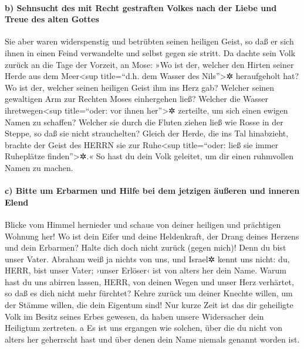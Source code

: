 \hypertarget{b-sehnsucht-des-mit-recht-gestraften-volkes-nach-der-liebe-und-treue-des-alten-gottes}{%
\paragraph{b) Sehnsucht des mit Recht gestraften Volkes nach der Liebe
und Treue des alten
Gottes}\label{b-sehnsucht-des-mit-recht-gestraften-volkes-nach-der-liebe-und-treue-des-alten-gottes}}

Sie aber waren widerspenstig und betrübten seinen
heiligen Geist, so daß er sich ihnen in einen Feind verwandelte und
selbst gegen sie stritt. Da dachte sein Volk zurück an
die Tage der Vorzeit, an Mose: »Wo ist der, welcher den Hirten seiner
Herde aus dem Meer\textless sup title=``d.h. dem Wasser des
Nils''\textgreater✲ heraufgeholt hat? Wo ist der, welcher seinen
heiligen Geist ihm ins Herz gab? Welcher seinen
gewaltigen Arm zur Rechten Moses einhergehen ließ? Welcher die Wasser
ihretwegen\textless sup title=``oder: vor ihnen her''\textgreater✲
zerteilte, um sich einen ewigen Namen zu schaffen?
Welcher sie durch die Fluten ziehen ließ wie Rosse in der
Steppe, so daß sie nicht strauchelten? Gleich der Herde,
die ins Tal hinabzieht, brachte der Geist des HERRN sie zur
Ruhe\textless sup title=``oder: ließ sie immer Ruheplätze
finden''\textgreater✲.« So hast du dein Volk geleitet, um dir einen
ruhmvollen Namen zu machen.

\hypertarget{c-bitte-um-erbarmen-und-hilfe-bei-dem-jetzigen-uxe4uuxdferen-und-inneren-elend}{%
\paragraph{c) Bitte um Erbarmen und Hilfe bei dem jetzigen äußeren und
inneren
Elend}\label{c-bitte-um-erbarmen-und-hilfe-bei-dem-jetzigen-uxe4uuxdferen-und-inneren-elend}}

Blicke vom Himmel hernieder und schaue von deiner
heiligen und prächtigen Wohnung her! Wo ist dein Eifer und deine
Heldenkraft, der Drang deines Herzens und dein Erbarmen? Halte dich doch
nicht zurück (gegen mich)! Denn du bist unser Vater.
Abraham weiß ja nichts von uns, und Israel✲ kennt uns nicht: du, HERR,
bist unser Vater; ›unser Erlöser‹ ist von alters her dein Name.
Warum hast du uns abirren lassen, HERR, von deinen Wegen
und unser Herz verhärtet, so daß es dich nicht mehr fürchtet? Kehre
zurück um deiner Knechte willen, um der Stämme willen, die dein Eigentum
sind! Nur kurze Zeit ist das dir geheiligte Volk im
Besitz seines Erbes gewesen, da haben unsere Widersacher dein Heiligtum
zertreten. a Es ist uns ergangen wie solchen, über die du
nicht von alters her geherrscht hast und über denen dein Name niemals
genannt worden ist.

